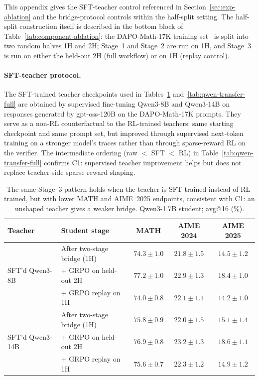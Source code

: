 \documentclass{article}
\begin{document}
This appendix gives the SFT-teacher control referenced in Section~\ref{sec:exp-ablation} and the bridge-protocol controls within the half-split setting. The half-split construction itself is described in the bottom block of Table~\ref{tab:component-ablation}: the DAPO-Math-17K training set~\citep{yu2025dapo} is split into two random halves 1H and 2H; Stage~1 and Stage~2 are run on 1H, and Stage~3 is run on either the held-out 2H (full workflow) or on 1H (replay control).

\paragraph{SFT-teacher protocol.} The SFT-trained teacher checkpoints used in Tables~\ref{tab:qwen-half-split-sft} and~\ref{tab:qwen-transfer-full} are obtained by supervised fine-tuning Qwen3-8B and Qwen3-14B on responses generated by gpt-oss-120B on the DAPO-Math-17K prompts. They serve as a non-RL counterfactual to the RL-trained teachers: same starting checkpoint and same prompt set, but improved through supervised next-token training on a stronger model's traces rather than through sparse-reward RL on the verifier. The intermediate ordering (raw $<$ SFT $<$ RL) in Table~\ref{tab:qwen-transfer-full} confirms C1: supervised teacher improvement helps but does not replace teacher-side sparse-reward shaping.

\begin{table}[!h]
\caption{The same Stage~3 pattern holds when the teacher is SFT-trained instead of RL-trained, but with lower MATH and AIME~2025 endpoints, consistent with C1: an unshaped teacher gives a weaker bridge. Qwen3-1.7B student; avg@16 (\%).}
\label{tab:qwen-half-split-sft}
\centering
\small
\begin{tabular}{@{}llccc@{}}
\toprule
Teacher & Student stage & MATH & AIME 2024 & AIME 2025 \\
\midrule
\multirow{3}{*}{SFT'd Qwen3-8B}  & After two-stage bridge (1H)   & $74.3 \pm 1.0$ & $21.8 \pm 1.5$ & $14.5 \pm 1.2$ \\
                                 & + GRPO on held-out 2H         & $77.2 \pm 1.0$ & $22.9 \pm 1.3$ & $18.4 \pm 1.0$ \\
                                 & + GRPO replay on 1H           & $74.0 \pm 0.8$ & $22.1 \pm 1.1$ & $14.2 \pm 1.0$ \\
\midrule
\multirow{3}{*}{SFT'd Qwen3-14B} & After two-stage bridge (1H)   & $75.8 \pm 0.9$ & $22.0 \pm 1.5$ & $15.1 \pm 1.4$ \\
                                 & + GRPO on held-out 2H         & $76.9 \pm 0.8$ & $23.2 \pm 1.3$ & $18.6 \pm 1.1$ \\
                                 & + GRPO replay on 1H           & $75.6 \pm 0.7$ & $22.3 \pm 1.2$ & $14.9 \pm 1.2$ \\
\bottomrule
\end{tabular}
\end{table}
\end{document}
